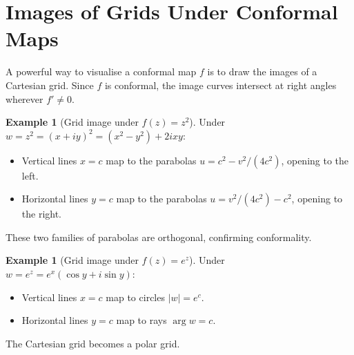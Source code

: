 \documentclass[12pt,a4paper,openany]{book}
\theoremstyle{definition}
\newtheorem{example}[definition]{Example}
\theoremstyle{plain}
\theoremstyle{remark}
\newcommand{\abs}[1]{\left|#1\right|}
\begin{document}
\section{Images of Grids Under Conformal Maps}\label{sec:grid-images}

A powerful way to visualise a conformal map $f$ is to draw the images
of a Cartesian grid.  Since $f$ is conformal, the image curves intersect
at right angles wherever $f'\neq 0$.

\begin{example}[Grid image under $f(z)=z^2$]\label{ex:grid-z2}
Under $w=z^2=(x+iy)^2=(x^2-y^2)+2ixy$:
\begin{itemize}
  \item Vertical lines $x=c$ map to the parabolas $u=c^2-v^2/(4c^2)$,
        opening to the left.
  \item Horizontal lines $y=c$ map to the parabolas $u=v^2/(4c^2)-c^2$,
        opening to the right.
\end{itemize}
These two families of parabolas are orthogonal, confirming conformality.
\end{example}

\begin{example}[Grid image under $f(z)=e^z$]\label{ex:grid-exp}
Under $w=e^z=e^x(\cos y+i\sin y)$:
\begin{itemize}
  \item Vertical lines $x=c$ map to circles $\abs{w}=e^c$.
  \item Horizontal lines $y=c$ map to rays $\arg w=c$.
\end{itemize}
The Cartesian grid becomes a polar grid.
\end{example}
\end{document}
